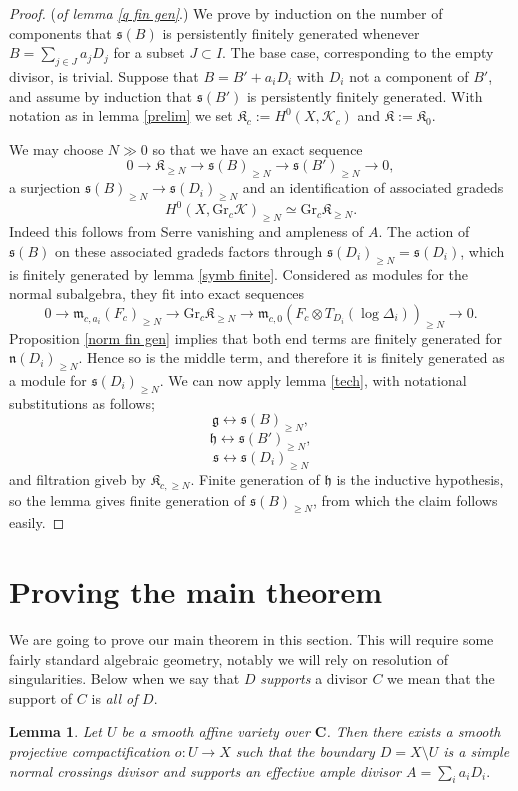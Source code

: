 \documentclass[12pt, oneside]{amsart}       %
\newtheorem{lemma}[theorem]{Lemma}
\theoremstyle{remark}
\renewcommand{\geq}{\geqslant}
\newcommand{\g}{\mathfrak{g}}
\begin{document}
\begin{proof} (\emph{of lemma \ref{q fin gen}}.) We prove by induction on the number of components that $\mathfrak{s}(B)$ is persistently finitely generated whenever $B=\sum_{j\in J}a_jD_j$ for a subset $J\subset I$. The base case, corresponding to the empty divisor, is trivial. Suppose that $B=B'+a_iD_i$ with $D_i$ not a component of $B'$, and assume by induction that $\mathfrak{s}(B')$ is persistently finitely generated. With notation as in lemma \ref{prelim} we set $\mathfrak{K}_c:=H^0(X,\mathcal{K}_c)$ and $\mathfrak{K}:=\mathfrak{K}_0$. 

We may choose $N\gg 0$ so that we have an exact sequence
$$0\to\mathfrak{K}_{\geq N}\to\mathfrak{s}(B)_{\geq N}\to\mathfrak{s}(B')_{\geq N}\to0,$$ a surjection $\mathfrak{s}(B)_{\geq N}\to\mathfrak{s}(D_i)_{\geq N}$ and an identification of associated gradeds $$H^0(X,\mathrm{Gr}_c\mathcal{K})_{\geq N}\simeq \mathrm{Gr}_c\mathfrak{K}_{\geq N}.$$ Indeed this follows from Serre vanishing and ampleness of $A$. The action of $\mathfrak{s}(B)$ on these associated gradeds factors through $\mathfrak{s}(D_i)_{\geq N}=\mathfrak{s}(D_i)$, which is finitely generated by lemma \ref{symb finite}. Considered as modules for the normal subalgebra, they fit into exact sequences
$$0\to\mathfrak{m}_{c,a_i}(F_c)_{\geq N}\to\mathrm{Gr}_c\mathfrak{K}_{\geq N}\to\mathfrak{m}_{c,0}(F_c\otimes T_{D_i}(\log\Delta_i))_{\geq N}\to0.$$
Proposition \ref{norm fin gen} implies that both end terms are finitely generated for $\mathfrak{n}(D_i)_{\geq N}$. Hence so is the middle term, and therefore it is finitely generated as a module for $\mathfrak{s}(D_i)_{\geq N}$. We can now apply lemma \ref{tech}, with notational substitutions as follows; $$\g\leftrightarrow\mathfrak{s}(B)_{\geq N},$$ $$\mathfrak{h}\leftrightarrow\mathfrak{s}(B')_{\geq N},$$ $$\mathfrak{s}\leftrightarrow\mathfrak{s}(D_i)_{\geq N}$$ and filtration giveb by  $\mathfrak{K}_{c,\geq N}$. Finite generation of $\mathfrak{h}$ is the inductive hypothesis, so the lemma gives finite generation of $\mathfrak{s}(B)_{\geq N}$, from which the claim follows easily. \end{proof}

\section{Proving the main theorem}

We are going to prove our main theorem in this section. This will require some fairly standard algebraic geometry, notably we will rely on resolution of singularities. Below when we say that $D$ \emph{supports} a divisor $C$ we mean that the support of $C$ is \emph{all of} $D$. 
\begin{lemma}\label{blowups} Let $U$ be a smooth affine variety over $\mathbf C$. Then there exists a smooth projective compactification $o:U\to X$ such that the boundary $D=X\setminus U$ is a simple normal crossings divisor and supports an effective ample divisor $A=\sum_i a_iD_i.$
\end{lemma}
\end{document}

